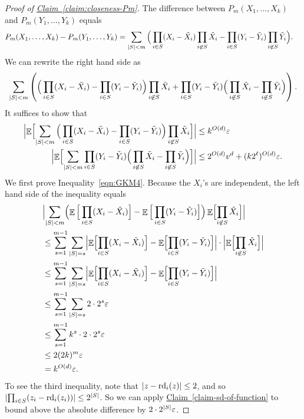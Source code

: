\documentclass[11pt]{article}
\numberwithin{equation}{section}
\theoremstyle{definition}
\theoremstyle{plain}
\newcommand{\expref}[2]{\hyperref[#2]{#1~\ref{#2}}}
\def\eps{\varepsilon}
\def\Blocklength{\ell}
\def\rd{\textnormal{rd}}
\DeclarePairedDelimiter{\abs}{\lvert}{\rvert}
\DeclareMathOperator*{\E}{\mathbb{E}}                 %
\begin{document}
  \begin{proof}[Proof of {\expref{Claim}{claim:closeness-Pm}}]
    The difference between $P_m(X_1, \ldots, X_k)$ and $P_m(Y_1, \ldots, Y_k)$ equals
    \begin{align*}
      P_m(X_1, \ldots, X_k) - P_m(Y_1, \ldots, Y_k)
        &= \sum_{\abs{S} < m} \Big( \prod_{i \in S} (X_i - \tilde X_i) \prod_{i \not\in S} \tilde X_i - \prod_{i \in S} (Y_i - \tilde Y_i) \prod_{i \not\in S} \tilde Y_i \Big) .
    \end{align*}
    We can rewrite the right hand side as
    \[
      \sum_{\abs{S} < m} \left( \Big( \prod_{i \in S} (X_i - \tilde X_i) - \prod_{i \in S} (Y_i - \tilde Y_i) \Big) \prod_{i \not\in S} \tilde X_i + \prod_{i \in S} (Y_i - \tilde Y_i) \Big( \prod_{i \not\in S} \tilde X_i - \prod_{i \not\in S} \tilde Y_i \Big) \right) .
    \]
    It suffices to show that
    \begin{align}
      \Bigl| \E \Bigl[ \sum_{\abs{S} < m} \Big( \prod_{i \in S} (X_i - \tilde X_i) - \prod_{i \in S} (Y_i - \tilde Y_i) \Big) \prod_{i \not\in S} \tilde X_i \Bigr] \Bigr| 
      &\le k^{O(d)} \eps \label{eqn:GKM4} \\
      \Bigl| \E \Bigl[ \sum_{\abs{S} < m} \prod_{i \in S} (Y_i - \tilde Y_i) \Big( \prod_{i \not\in S} \tilde X_i - \prod_{i \not\in S} \tilde Y_i \Big) \Bigr] \Bigr| 
      &\le 2^{O(d)} v^d + (k 2^\Blocklength)^{O(d)} \eps . \label{eqn:GKM5}
    \end{align}
    We first prove Inequality~\eqref{eqn:GKM4}.
    Because the $X_i$'s are independent, the left hand side of the inequality equals
    \begin{align*}
      &\Bigl| \sum_{\abs{S} < m} \Bigl( \E \Big[ \prod_{i \in S} (X_i - \tilde X_i) \Big] - \E \Big[ \prod_{i \in S} (Y_i - \tilde Y_i) \Big] \Bigr) \E \Bigl[ \prod_{i \not\in S} \tilde X_i \Bigr] \Bigr| \\
      &\le \sum_{s = 1}^{m - 1} \sum_{ \abs{S} = s } \Bigl| \E \Bigl[ \prod_{i \in S} (X_i - \tilde X_i) \Bigr] - \E \Bigl[ \prod_{i \in S} (Y_i - \tilde Y_i) \Bigr] \Bigr| \cdot \Bigl| \E \Bigl[ \prod_{i \not\in S} \tilde X_i \Bigr] \Bigr| \\
      &\le \sum_{s = 1}^{m - 1} \sum_{ \abs{S} = s } \Bigl| \E \Bigl[
        \prod_{i \in S} (X_i - \tilde X_i) \Bigr] - \E \Bigl[ \prod_{i \in S}
        (Y_i - \tilde Y_i) \Bigr] \Bigr| \\
      &\le \sum_{s = 1}^{m - 1} \sum_{ \abs{S} = s } 2 \cdot 2^s \eps \\
      &\le \sum_{s = 1}^{m - 1} k^s \cdot  2 \cdot 2^s \eps \\
      &\le 2 (2k)^m \eps \\
      &= k^{O(d)} \eps.
    \end{align*}
    To see the third inequality, note that $\abs{z - \rd_i(z)} \le 2$, and so $\abs{\prod_{i \in S} (z_i - \rd_i(z_i))} \le 2^{\abs{S}}$.
    So we can apply \expref{Claim}{claim-sd-of-function} to bound above the absolute difference by $2 \cdot 2^{\abs{S}} \eps$.


\end{proof}
\end{document}
